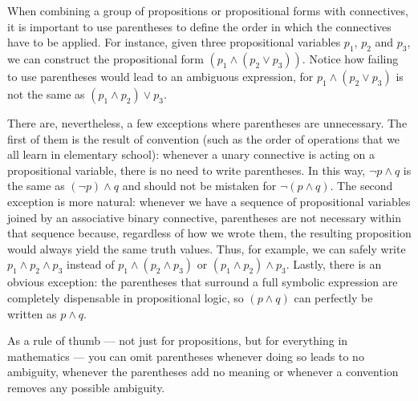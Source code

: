 \begin{para}

\label{hierarchy}
When combining a group of propositions or propositional forms with connectives, it is important to use parentheses to define the order in which the connectives have to be applied.
For instance, given three propositional variables $p_1$, $p_2$ and $p_3$, we can construct the propositional form $(p_1 \land (p_2 \lor p_3))$. Notice how failing to use parentheses would lead to an ambiguous expression, for $p_1 \land (p_2\lor p_3)$ is not the same as $(p_1 \land p_2) \lor p_3$.

There are, nevertheless, a few exceptions where parentheses are unnecessary.
The first of them is the result of convention (such as the order of operations that we all learn in elementary school):  whenever a unary connective is acting on a propositional variable, there is no need to write parentheses.
In this way, $\lnot p \land q$ is the same as $(\lnot p)\land q$ and should not be mistaken for $\lnot(p\land q)$.
The second exception is more natural: whenever we have a sequence of propositional variables joined by an associative binary connective, parentheses are not necessary within that sequence because, regardless of how we wrote them, the resulting proposition would always yield the same truth values.
Thus, for example, we can safely write $p_1\land p_2 \land p_3$ instead of $p_1\land (p_2 \land p_3)$ or $(p_1\land p_2) \land p_3$.
Lastly, there is an obvious exception: the parentheses that surround a full symbolic expression are completely dispensable in propositional logic, so $(p\land q)$ can perfectly be written as $p\land q$.

As a rule of thumb --- not just for propositions, but for everything in mathematics --- you can omit parentheses whenever doing so leads to no ambiguity, whenever the parentheses add no meaning or whenever a convention removes any possible ambiguity. 

\end{para}

